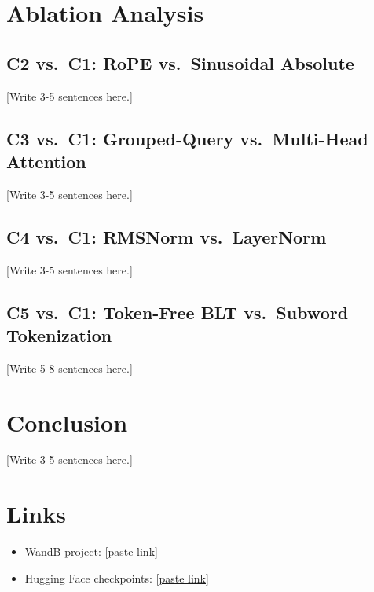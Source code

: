\documentclass[12pt]{article}
\begin{document}
\section{Ablation Analysis}

\subsection{C2 vs.\ C1: RoPE vs.\ Sinusoidal Absolute}
[Write 3-5 sentences here.]

\subsection{C3 vs.\ C1: Grouped-Query vs.\ Multi-Head Attention}
[Write 3-5 sentences here.]

\subsection{C4 vs.\ C1: RMSNorm vs.\ LayerNorm}
[Write 3-5 sentences here.]

\subsection{C5 vs.\ C1: Token-Free BLT vs.\ Subword Tokenization}
[Write 5-8 sentences here.]

\section{Conclusion}
[Write 3-5 sentences here.]

\clearpage
\section*{Links}
\begin{itemize}
  \item WandB project: \url{[paste link]}
  \item Hugging Face checkpoints: \url{[paste link]}
\end{itemize}
\end{document}
